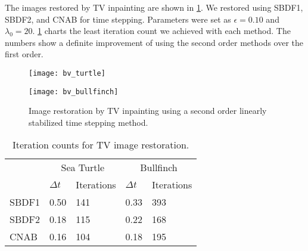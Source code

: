 The images restored by TV inpainting are shown in \cref{fig:bv inpainting}. We restored using SBDF1, SBDF2, and CNAB for time stepping. Parameters were set as $\epsilon=0.10$ and $\lambda_0=20$. \cref{tab:bv iter counts} charts the least iteration count we achieved with each method. The numbers show a definite improvement of using the second order methods over the first order. 
\begin{figure}[htb!]
\centering
\begin{minipage}{0.65\textwidth}
	\texttt{[image: bv\_turtle]}
\end{minipage}
\begin{minipage}{0.65\textwidth}
	\texttt{[image: bv\_bullfinch]}
\end{minipage}
\caption[Image restoration by TV inpainting.]{Image restoration by TV inpainting using a second order linearly stabilized time stepping method.}
\label{fig:bv inpainting}
\end{figure}


\begin{table}[htb!]
\caption[Iteration counts for TV image restoration.]{Iteration counts for TV image restoration.}
        \centering\begin{tabular}{lll ll} \toprule[1.25pt]
& \multicolumn{2}{c}{Sea Turtle} & \multicolumn{2}{c}{Bullfinch}
\\
& $\Delta t$ & Iterations & $\Delta t$ & Iterations
\\ \midrule
SBDF1 & 0.50 & 141 & 0.33 & 393 
\\
SBDF2& 0.18 & 115 & 0.22 & 168
\\             
CNAB &  0.16 & 104 & 0.18 & 195
\\ \bottomrule[1.25pt]
\end{tabular}
\label{tab:bv iter counts}
\end{table}

